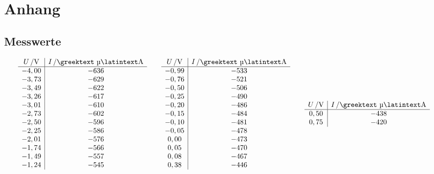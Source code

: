 \documentclass[numbers=noenddot,12pt,a4paper]{scrartcl}
\newcommand{\greek}[1]{\greektext#1\latintext}
\begin{document}
\section{Anhang}
\subsection{Messwerte}
\begin{table}[H]
	\begin{align*}
\begin{array}{c|c}
\unit[U]{/V} & \unit[I]{/\text{\greek{µ}}A}\\\hline
	-4,00 & -636 \\
	-3,73 & -629 \\
	-3,49 & -622 \\
	-3,26 & -617 \\
	-3,01 & -610 \\
	-2,73 & -602 \\
	-2,50 & -596 \\
	-2,25 & -586 \\
	-2,01 & -576 \\
	-1,74 & -566 \\
	-1,49 & -557 \\
	-1,24 & -545 \\
	\end{array}
	\hspace{2em}
	\begin{array}{c|c}
	\unit[U]{/V} & \unit[I]{/\text{\greek{µ}}A}\\\hline
	-0,99 & -533 \\
	-0,76 & -521 \\
	-0,50 & -506 \\
	-0,25 & -490 \\
	-0,20 & -486 \\
	-0,15 & -484 \\
	-0,10 & -481 \\
	-0,05 & -478 \\
	0,00 & -473 \\
	0,05 & -470 \\
	0,08 & -467 \\
	0,38 & -446 \\
	\end{array}
	\hspace{2em}
	\begin{array}{c|c}
	\unit[U]{/V} & \unit[I]{/\text{\greek{µ}}A}\\\hline
	0,50 & -438 \\
	0,75 & -420 \\

\end{array}
\end{align*}
\end{table}
\end{document}
